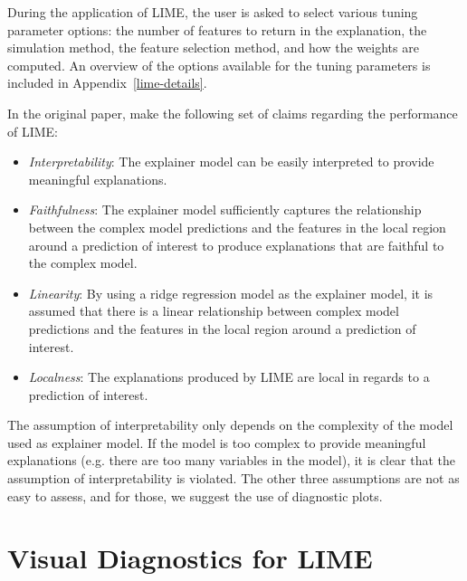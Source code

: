 \documentclass[AMS,STIX2COL]{WileyNJD-v2}\usepackage[]{graphicx}\usepackage[]{color}
\begin{document}
During the application of LIME, the user is asked to select various tuning parameter options: the number of features to return in the explanation, the simulation method, the feature selection method, and how the weights are computed. An overview of the options available for the tuning parameters is included in Appendix~\ref{lime-details}.

In the original paper, \citet{ribeiro:2016} make the following set of claims regarding the performance of LIME:

\begin{itemize}
\item \emph{Interpretability}: The explainer model can be easily interpreted to provide meaningful explanations.
\item \emph{Faithfulness}: The explainer model sufficiently captures the relationship between the complex model predictions and the features in the local region around a prediction of interest to produce explanations that are faithful to the complex model.
\item \emph{Linearity}: By using a ridge regression model as the explainer model, it is assumed that there is a linear relationship between complex model predictions and the features in the local region around a prediction of interest.
\item \emph{Localness}: The explanations produced by LIME are local in regards to a prediction of interest.
\end{itemize}

The assumption of interpretability only depends on the complexity of the model used as explainer model. If the model is too complex to provide meaningful explanations (e.g. there are too many variables in the model), it is clear that the assumption of interpretability is violated. The other three assumptions are not as easy to assess, and for those, we suggest the use of diagnostic plots. 

\section{Visual Diagnostics for LIME} \label{diagnostics}
\end{document}
